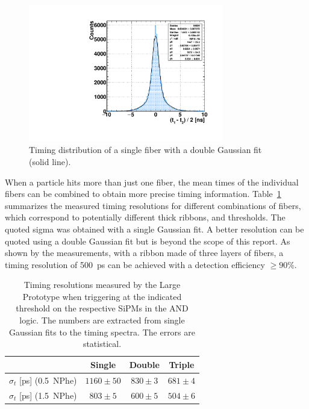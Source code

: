 \begin{refsection}
        \begin{figure}
        \centering
         \includegraphics[height = 6cm]{Figures/muEDM/prototype/prototype_timing.pdf}
         \caption{Timing distribution of a single fiber with a double Gaussian fit (solid line).}
        	\label{fig:TimingSingleFibre}
        \end{figure}

        \noindent
        When a particle hits more than just one fiber, the mean times of the individual fibers can be combined to obtain more precise timing information. Table~\ref{tab:TimingResRibbon} summarizes the measured timing resolutions for different combinations of fibers, which correspond to potentially different thick ribbons, and thresholds. The quoted sigma was obtained with a single Gaussian fit. A better resolution can be quoted using a double Gaussian fit but is beyond the scope of this report. As shown by the measurements, with a ribbon made of three layers of fibers, a timing resolution of \SI{500}{ps} can be achieved with a detection efficiency $\geq90\%$.\\
        
        \begin{table}
        	\centering
        		\begin{tabular}{l | c | c | c }
          			  & Single & Double & Triple \\ \hline\hline
        			  $\sigma_{t}$ [ps] \hspace{0.32cm} (0.5~NPhe) & $1160\pm50$ & $830\pm3$ & $681\pm4$ \\
        			 $\sigma_{t}$ [ps] \hspace{0.32cm} (1.5~NPhe) & $803\pm5$& $600\pm5$ & $504\pm6$  \\
        		\end{tabular}
             \caption[]{Timing resolutions measured by the Large Prototype when triggering at the indicated threshold on the respective SiPMs in the AND logic. The numbers are extracted from single Gaussian fits to the timing spectra. The errors are statistical. }
        	\label{tab:TimingResRibbon}
        \end{table}


\end{refsection}
